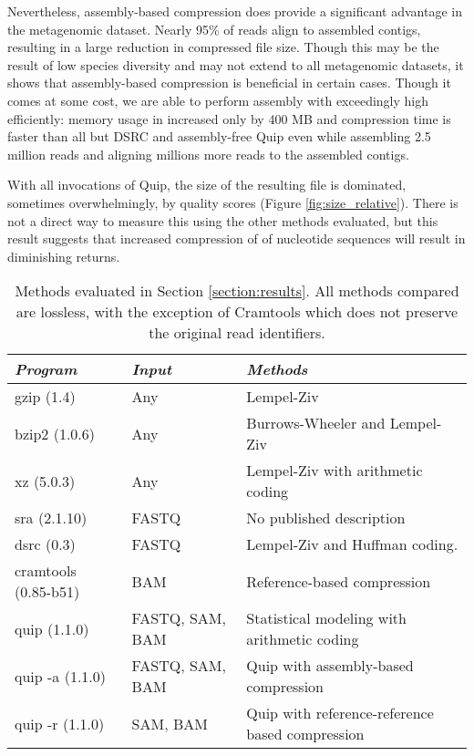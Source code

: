 \documentclass[twocolumn]{article}
\begin{document}
Nevertheless, assembly-based compression does provide a significant advantage
in the metagenomic dataset. Nearly 95\% of reads align to assembled contigs,
resulting in a large reduction in compressed file size. Though this may be the
result of low species diversity and may not extend to all metagenomic
datasets, it shows that assembly-based compression is beneficial in certain
cases. Though it comes at some cost, we are able to perform assembly with
exceedingly  high efficiently: memory usage in increased only by 400 MB and
compression time is faster than all but DSRC and assembly-free Quip even while
assembling 2.5 million reads and aligning millions more reads to the assembled
contigs.

With all invocations of Quip, the size of the resulting file is dominated,
sometimes overwhelmingly, by quality scores (Figure \ref{fig:size_relative}).
There is not a direct way to measure this using the other methods evaluated,
but this result suggests that increased compression of of nucleotide sequences
will result in diminishing returns.



\begin{table*}
\begin{center}
\begin{tabular}{lll}
\textit{Program}     & \textit{Input} & \textit{Methods} \\ \hline
gzip (1.4)           & Any &
Lempel-Ziv \\

bzip2 (1.0.6)        & Any &
Burrows-Wheeler and Lempel-Ziv \\

xz  (5.0.3)          & Any & 
Lempel-Ziv with arithmetic coding \\

sra (2.1.10)         & FASTQ &
No published description \\

dsrc (0.3)           & FASTQ &
Lempel-Ziv and Huffman coding. \\

cramtools (0.85-b51) & BAM &
Reference-based compression \\

quip (1.1.0)         & FASTQ, SAM, BAM &
Statistical modeling with arithmetic coding \\

quip -a (1.1.0)      & FASTQ, SAM, BAM &
Quip with assembly-based compression \\

quip -r (1.1.0) & SAM, BAM &
Quip with reference-reference based compression \\
\end{tabular}
\caption{Methods evaluated in Section \ref{section:results}.
All methods compared are lossless, with the exception of Cramtools which
does not preserve the original read identifiers.}
\end{center}
\label{tab:methods}
\end{table*}
\end{document}

